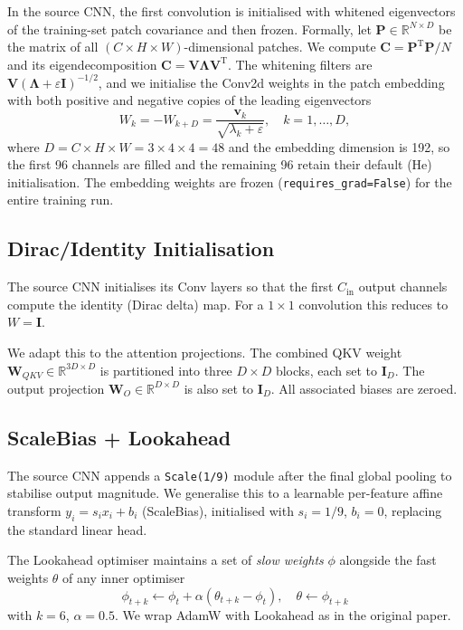 \documentclass[10pt,twocolumn]{article}
\begin{document}
In the source CNN, the first convolution is initialised with whitened eigenvectors of the training-set patch covariance and then frozen. Formally, let $\mathbf{P} \in \mathbb{R}^{N \times D}$ be the matrix of all $(C \times H \times W)$-dimensional patches. We compute $\mathbf{C} = \mathbf{P}^\mathrm{T} \mathbf{P} / N$ and its eigendecomposition $\mathbf{C} = \mathbf{V} \boldsymbol{\Lambda} \mathbf{V}^\mathrm{T}$. The whitening filters are $\mathbf{V} {(\boldsymbol{\Lambda} + \varepsilon \mathbf{I})}^{-1/2}$, and we initialise the Conv2d weights in the patch embedding with both positive and negative copies of the leading eigenvectors
\begin{equation}
    W_k = -W_{k+D} = \frac{\mathbf{v}_k}{\sqrt{\lambda_k + \varepsilon}},
    \quad k = 1, \dots, D,
\end{equation}
where $D = C \times H \times W = 3\times4\times4 = 48$ and the embedding dimension
is 192, so the first 96 channels are filled and the remaining 96 retain their
default (He) initialisation.
The embedding weights are frozen (\texttt{requires\_grad=False}) for the entire
training run.

\subsection{Dirac/Identity Initialisation}\label{sec:dirac}
The source CNN initialises its Conv layers so that the first $C_\text{in}$
output channels compute the identity (Dirac delta) map.
For a $1\times1$ convolution this reduces to $W = \mathbf{I}$.

We adapt this to the attention projections.
The combined QKV weight $\mathbf{W}_{QKV} \in \mathbb{R}^{3D \times D}$ is
partitioned into three $D\times D$ blocks, each set to $\mathbf{I}_D$.
The output projection $\mathbf{W}_O \in \mathbb{R}^{D\times D}$ is also set to
$\mathbf{I}_D$.
All associated biases are zeroed.

\subsection{ScaleBias + Lookahead}\label{sec:scalebias}
The source CNN appends a \texttt{Scale(1/9)} module after the final global
pooling to stabilise output magnitude.
We generalise this to a learnable per-feature affine transform
$y_i = s_i x_i + b_i$ (ScaleBias), initialised with $s_i = 1/9$, $b_i = 0$,
replacing the standard linear head.

The Lookahead optimiser \citep{zhang2019lookahead} maintains a set of \emph{slow weights} $\phi$ alongside the fast weights $\theta$ of any inner optimiser
\begin{equation}
    \phi_{t+k} \gets \phi_t + \alpha \left( \theta_{t+k} - \phi_t \right), \quad
    \theta \gets \phi_{t+k}
\end{equation}
with $k=6$, $\alpha=0.5$. We wrap AdamW with Lookahead as in the original paper.
\end{document}
